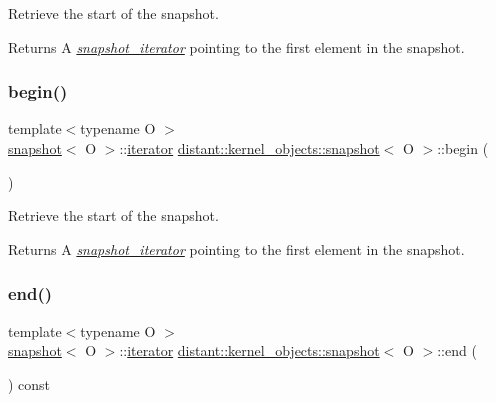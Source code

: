 Retrieve the start of the snapshot. 

\begin{DoxyReturn}{Returns}
A {\itshape \mbox{\hyperlink{classdistant_1_1kernel__objects_1_1snapshot__iterator}{snapshot\+\_\+iterator}}} pointing to the first element in the snapshot. 
\end{DoxyReturn}
\mbox{\label{classdistant_1_1kernel__objects_1_1snapshot_ab23f1b74e2799ece901299d4f69015cc}} 
\subsubsection{\texorpdfstring{begin()}{begin()}\hspace{0.1cm}{\footnotesize\ttfamily [2/2]}}
{\footnotesize\ttfamily template$<$typename O $>$ \\
\mbox{\hyperlink{classdistant_1_1kernel__objects_1_1snapshot}{snapshot}}$<$ O $>$\+::\mbox{\hyperlink{classdistant_1_1kernel__objects_1_1snapshot__iterator}{iterator}} \mbox{\hyperlink{classdistant_1_1kernel__objects_1_1snapshot}{distant\+::kernel\+\_\+objects\+::snapshot}}$<$ O $>$\+::begin (\begin{DoxyParamCaption}{ }\end{DoxyParamCaption})}



Retrieve the start of the snapshot. 

\begin{DoxyReturn}{Returns}
A {\itshape \mbox{\hyperlink{classdistant_1_1kernel__objects_1_1snapshot__iterator}{snapshot\+\_\+iterator}}} pointing to the first element in the snapshot. 
\end{DoxyReturn}
\mbox{\label{classdistant_1_1kernel__objects_1_1snapshot_a4fd564b2c8dda5816fb134688e708924}} 
\subsubsection{\texorpdfstring{end()}{end()}\hspace{0.1cm}{\footnotesize\ttfamily [1/2]}}
{\footnotesize\ttfamily template$<$typename O $>$ \\
\mbox{\hyperlink{classdistant_1_1kernel__objects_1_1snapshot}{snapshot}}$<$ O $>$\+::\mbox{\hyperlink{classdistant_1_1kernel__objects_1_1snapshot__iterator}{iterator}} \mbox{\hyperlink{classdistant_1_1kernel__objects_1_1snapshot}{distant\+::kernel\+\_\+objects\+::snapshot}}$<$ O $>$\+::end (\begin{DoxyParamCaption}{ }\end{DoxyParamCaption}) const}




